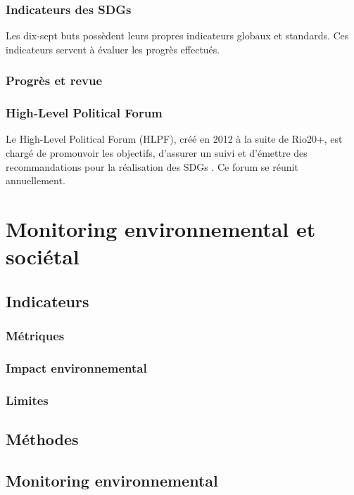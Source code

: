 \documentclass[10pt, conference, compsocconf]{llncs}
\begin{document}
		\subsubsection{Indicateurs des SDGs}
			Les dix-sept buts possèdent leurs propres indicateurs globaux et standards. Ces indicateurs servent à évaluer les progrès effectués.
		
		\subsubsection{Progrès et revue}
		
		\subsubsection{High-Level Political Forum}
			Le High-Level Political Forum (HLPF), créé en 2012 à la suite de Rio20+, est chargé de promouvoir les objectifs, d'assurer un suivi et d'émettre des recommandations pour la réalisation des SDGs \cite{united_nations_high-level_nodate}. Ce forum se réunit annuellement.

\section{Monitoring environnemental et sociétal}
	\subsection{Indicateurs}
		\subsubsection{Métriques}
		\subsubsection{Impact environnemental}			
		\subsubsection{Limites}
	
	\subsection{Méthodes}

	\subsection{Monitoring environnemental}
\end{document}
